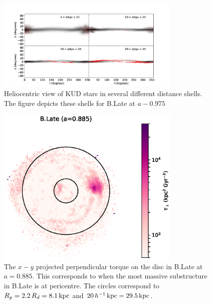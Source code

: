 \begin{figure}
	\centering
	\includegraphics[width=0.8\textwidth]{../figures/fiducial_halo_268818_late_insert_lb_s_095_overlay.pdf}\caption{Heliocentric view of KUD stars in several different distance shells. The figure depicts these shells for B.Late at $a-0.975$} \label{fig:lb_halo_b_late}
\end{figure}
\begin{figure}
	\includegraphics[width=0.8\textwidth]{../figures/b_late_torque_a_0_885.eps}
	\caption{The $x-y$ projected perpendicular torque on the disc in B.Late at $a=0.885$. This corresponds to when the most massive substructure in B.Late is at pericentre. The circles correspond to $R_p = 2.2\,R_d=8.1\,\text{kpc}$ and $20\,h^{-1} \, \text{kpc}=29.5\,\text{kpc}$.}\label{fig:torque_b_late}
\end{figure}

